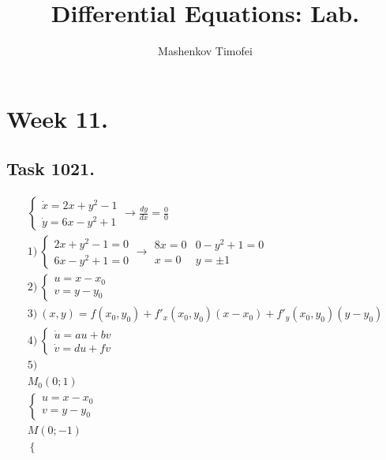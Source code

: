 \documentclass{article}
\title{Differential Equations: Lab.}
\author{Mashenkov Timofei}
\begin{document}
\maketitle{}

\section*{Week 11.}

\subsection*{Task 1021.}

\addtolength{\jot}{1pt}
\begin{fleqn}[1\parindent]
  \begin{gather*}
    \begin{cases}
      \dot{x}=2x+y^2-1\\ 
      \dot{y}=6x-y^2+1
    \end{cases} \rightarrow 
    \frac{dy}{dx} = \frac{0}{0} \\ 
    1)\ \begin{cases}
      2x+y^2-1=0 \\ 
      6x-y^2+1=0
    \end{cases} \rightarrow 
    \begin{matrix}
      8x = 0 & 0-y^2+1=0 \\ 
      x = 0 & y = \pm1
    \end{matrix} \\ 
    2)\ \begin{cases}
      u=x-x_0 \\ 
      v = y-y_0
    \end{cases} \\ 
    3)\ (x,y) = f(x_0,y_0)+f'_x(x_0,y_0)(x-x_0)+f'_y(x_0,y_0)(y-y_0) \\
    4)\ \begin{cases}
      \dot{u}=au+bv \\ 
      \dot{v}=du+fv 
    \end{cases} \\ 
    5) \\ 
    M_0(0;1) \\ 
    \begin{cases}
      u=x-x_0 \\ 
      v=y-y_0
    \end{cases} \\ 
    M(0;-1) \\ 
    \begin{cases}

\end{cases}
\end{gather*}
\end{fleqn}
\end{document}
